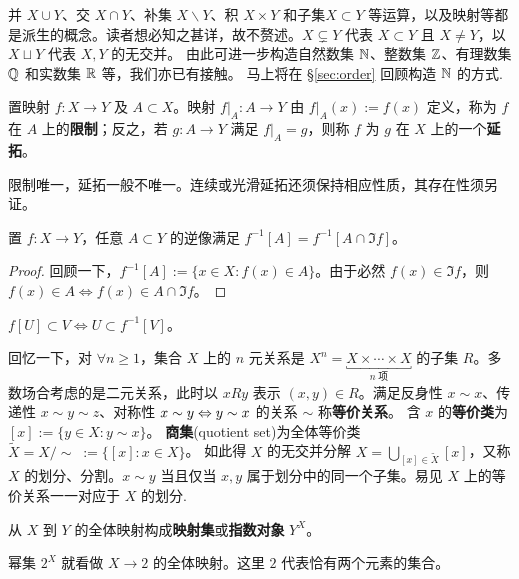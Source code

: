 并 $X \cup Y$、交 $X \cap Y$、补集 $X \backslash Y$、积 $X \times Y$ 和子集$X \subset Y$ 等运算，以及映射等都是派生的概念。读者想必知之甚详，故不赘述。$X \subsetneq Y$ 代表 $X \subset Y$ 且 $X \neq Y$，以 $X \sqcup Y$ 代表 $X, Y$ 的无交并。
由此可进一步构造自然数集 $\mathbb{N}$、整数集 $\mathbb{Z}$、有理数集 $\mathbb{Q}$ 和实数集 $\mathbb{R}$ 等，我们亦已有接触。
马上将在 \S\ref{sec:order} 回顾构造 $\mathbb{N}$ 的方式.

\begin{definition}
    置映射 $f:X\to Y$ 及 $A\subset X$。映射 $f|_A:A\to Y$ 由 $f|_A(x):=f(x)$ 定义，称为 $f$ 在 $A$ 上的\textbf{限制}；反之，若 $g:A\to Y$ 满足 $f|_A=g$，则称 $f$ 为 $g$ 在 $X$ 上的一个\textbf{延拓}。
\end{definition}
\begin{remark}
    限制唯一，延拓一般不唯一。连续或光滑延拓还须保持相应性质，其存在性须另证。
\end{remark}

\begin{theorem}
    置 $f:X\to Y$，任意 $A\subset Y$ 的逆像满足 $f^{-1}[A]=f^{-1}[A\cap\Im f]$。
\end{theorem}

\begin{proof}
    回顾一下，$f^{-1}[A]:=\{x\in X:f(x)\in A\}$。由于必然 $f(x)\in\Im f$，则 $f(x)\in A\iff f(x)\in A\cap \Im f$。
\end{proof}

\begin{theorem}
    $f[U] \subset V \iff U\subset f^{-1}[V]$。
\end{theorem}

回忆一下，对 $\forall n \geqslant 1$，集合 $X$ 上的 $n$ 元关系是 $X^n = \underbracket{X \times \cdots \times X}_{n\; \text{项}}$ 的子集 $R$。多数场合考虑的是二元关系，此时以 $xRy$ 表示 $(x,y) \in R$。满足反身性 $x\sim x$、传递性 $x\sim y\sim z$、对称性 $x\sim y\Leftrightarrow y\sim x$ 的关系 $\sim$ 称\textbf{等价关系}。
含 $x$ 的\textbf{等价类}为 $[x] := \{y \in X: y \sim x \}$。
\textbf{商集}(quotient set)为全体等价类 $\tilde X = X/\sim\; := \{[x]:x\in X\}$。
如此得 $X$ 的无交并分解 $X = \bigcup_{[x] \in \tilde X} [x]$，又称 $X$ 的划分、分割。$x \sim y$ 当且仅当 $x,y$ 属于划分中的同一个子集。易见 $X$ 上的等价关系一一对应于 $X$ 的划分.

\begin{definition}
    从 $X$ 到 $Y$ 的全体映射构成\textbf{映射集}或\textbf{指数对象} $Y^X$。
\end{definition}
\begin{remark}
	幂集 $2^X$ 就看做 $X\to 2$ 的全体映射。这里 $2$ 代表恰有两个元素的集合。
\end{remark}

